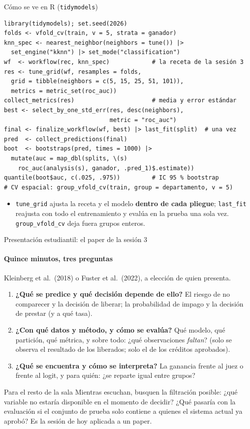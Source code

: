 \documentclass{beamer}
\newcommand{\1}{\mathbb{I}}
\begin{document}
\begin{frame}[fragile]{Cómo se ve en R (\texttt{tidymodels})}
\scriptsize
\begin{verbatim}
library(tidymodels); set.seed(2026)
folds <- vfold_cv(train, v = 5, strata = ganador)
knn_spec <- nearest_neighbor(neighbors = tune()) |>
  set_engine("kknn") |> set_mode("classification")
wf  <- workflow(rec, knn_spec)            # la receta de la sesión 3
res <- tune_grid(wf, resamples = folds,
  grid = tibble(neighbors = c(5, 15, 25, 51, 101)),
  metrics = metric_set(roc_auc))
collect_metrics(res)                      # media y error estándar
best <- select_by_one_std_err(res, desc(neighbors),
                              metric = "roc_auc")
final <- finalize_workflow(wf, best) |> last_fit(split)  # una vez
pred  <- collect_predictions(final)
boot  <- bootstraps(pred, times = 1000) |>
  mutate(auc = map_dbl(splits, \(s)
    roc_auc(analysis(s), ganador, .pred_1)$.estimate))
quantile(boot$auc, c(.025, .975))         # IC 95 % bootstrap
# CV espacial: group_vfold_cv(train, group = departamento, v = 5)
\end{verbatim}
\normalsize
\small
\begin{itemize}\itemsep2pt
  \item \texttt{tune\_grid} ajusta la receta y el modelo \textbf{dentro de cada pliegue}; \texttt{last\_fit} reajusta con todo el entrenamiento y evalúa en la prueba una sola vez. \texttt{group\_vfold\_cv} deja fuera grupos enteros.
\end{itemize}
\end{frame}

\begin{frame}{Presentación estudiantil: el paper de la sesión 3}
\framesubtitle{Quince minutos, tres preguntas}
\small
Kleinberg et al.\ (2018) o Fuster et al.\ (2022), a elección de quien presenta.
\begin{enumerate}\itemsep5pt
  \item \textbf{¿Qué se predice y qué decisión depende de ello?} El riesgo de no comparecer y la decisión de liberar; la probabilidad de impago y la decisión de prestar (y a qué tasa).
  \item \textbf{¿Con qué datos y método, y cómo se evalúa?} Qué modelo, qué partición, qué métrica, y sobre todo: ¿qué observaciones \emph{faltan}? (solo se observa el resultado de los liberados; solo el de los créditos aprobados).
  \item \textbf{¿Qué se encuentra y cómo se interpreta?} La ganancia frente al juez o frente al logit, y para quién: ¿se reparte igual entre grupos?
\end{enumerate}
\pause
\vspace{0.15cm}
\begin{block}{Para el resto de la sala}
Mientras escuchan, busquen la filtración posible: ¿qué variable no estaría disponible en el momento de decidir? ¿Qué pasaría con la evaluación si el conjunto de prueba solo contiene a quienes el sistema actual ya aprobó? Es la sesión de hoy aplicada a un paper.
\end{block}
\end{frame}
\end{document}
